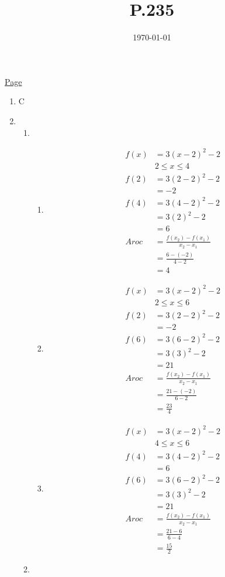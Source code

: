 \documentclass[11pt]{article}
\date{\today}
\title{P.235}
\begin{document}
\maketitle
\tableofcontents

\href{file:///home/kadin/Textbooks/Chapter\%204.pdf}{Page}

\begin{enumerate}
\item C
\item \begin{enumerate}
\item \begin{enumerate}
\item \begin{align*}
f(x) &= 3(x-2)^2-2\\
&2 \le x \le 4\\
f(2) &= 3(2-2)^2-2\\
&= -2\\
f(4) &= 3(4-2)^2-2\\
&= 3(2)^2-2\\
&= 6\\
Aroc &= \frac{f(x_2)-f(x_1)}{x_2-x_1}\\
&= \frac{6-(-2)}{4-2}\\
&= 4
\end{align*}
\item \begin{align*}
f(x) &= 3(x-2)^2-2\\
&2 \le x \le 6\\
f(2) &= 3(2-2)^2-2\\
&= -2\\
f(6) &= 3(6-2)^2-2\\
&= 3(3)^2-2\\
&= 21\\
Aroc &= \frac{f(x_2)-f(x_1)}{x_2-x_1}\\
&= \frac{21-(-2)}{6-2}\\
&= \frac{23}{4}
\end{align*}
\item \begin{align*}
f(x) &= 3(x-2)^2-2\\
&4 \le x \le 6\\
f(4) &= 3(4-2)^2-2\\
&= 6\\
f(6) &= 3(6-2)^2-2\\
&= 3(3)^2-2\\
&= 21\\
Aroc &= \frac{f(x_2)-f(x_1)}{x_2-x_1}\\
&= \frac{21-6}{6-4}\\
&= \frac{15}{2}
\end{align*}
\end{enumerate}
\item 


\end{enumerate}
\end{enumerate}
\end{document}
